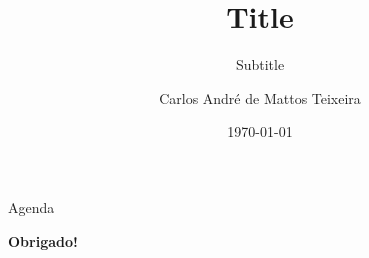 \documentclass[aspectratio=169,xcolor=dvipsnames]{beamer}
\title[short title]{Title}
\subtitle{Subtitle}
\author[André Mattos]{Carlos André de Mattos Teixeira}
\institute[UFPA] 
{
    Universidade Federal do Pará
}
\date{\today}
\begin{document}
\begin{frame}
    \titlepage
\end{frame}

\begin{frame}{Agenda}
    \tableofcontents
\end{frame}



% 
% 
% 


%     
%     

\begin{frame}
    \Huge{\centerline{\textbf{Obrigado!}}}
\end{frame}

\end{document}
